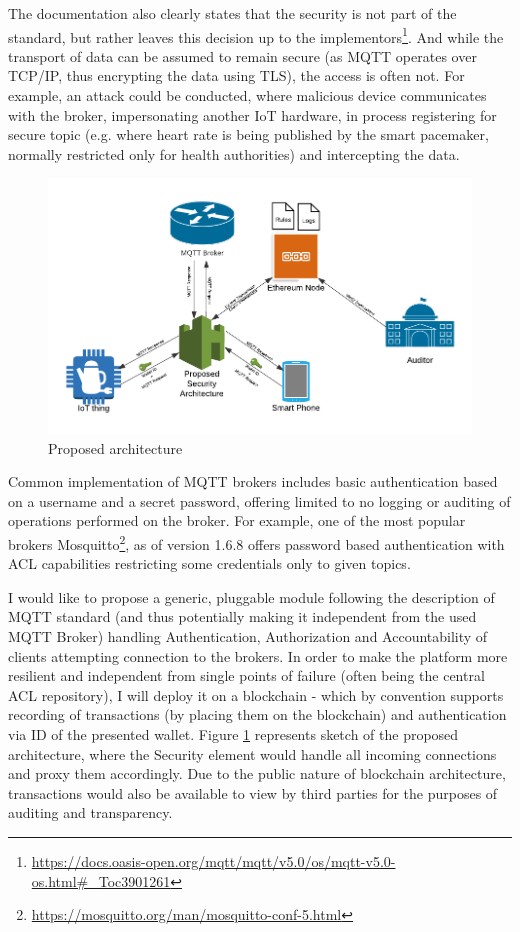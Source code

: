 \documentclass[a4paper,12pt]{article}
\begin{document}
The documentation also clearly states that the security is not part of the standard, but rather leaves this decision up to the implementors\footnote{\url{https://docs.oasis-open.org/mqtt/mqtt/v5.0/os/mqtt-v5.0-os.html\#\_Toc3901261}}. And while the transport of data can be assumed to remain secure (as MQTT operates over TCP/IP, thus encrypting the data using TLS), the access is often not. For example, an attack could be conducted, where malicious device communicates with the broker, impersonating another IoT hardware, in process registering for secure topic (e.g. where heart rate is being published by the smart pacemaker, normally restricted only for health authorities) and intercepting the data.

\begin{figure}[ht]
  \centering
  \includegraphics[scale=1.1]{iot_attack}
  \caption{Proposed architecture}\label{fig:iot1}
\end{figure}

Common implementation of MQTT brokers includes basic authentication based on a username and a secret password, offering limited to no logging or auditing of operations performed on the broker. For example, one of the most popular brokers Mosquitto\footnote{\url{https://mosquitto.org/man/mosquitto-conf-5.html}}, as of version 1.6.8 offers password based authentication with ACL capabilities restricting some credentials only to given topics. 

I would like to propose a generic, pluggable module following the description of MQTT standard (and thus potentially making it independent from the used MQTT Broker) handling Authentication, Authorization and Accountability of clients attempting connection to the brokers. In order to make the platform more resilient and independent from single points of failure (often being the central ACL repository), I will deploy it on a blockchain - which by convention supports recording of transactions (by placing them on the blockchain) and authentication via ID of the presented wallet. Figure \ref{fig:iot1} represents sketch of the proposed architecture, where the Security element would handle all incoming connections and proxy them accordingly. Due to the public nature of blockchain architecture, transactions would also be available to view by third parties for the purposes of auditing and transparency.
\end{document}
